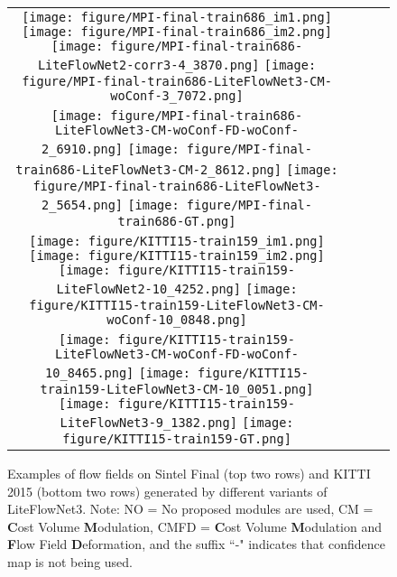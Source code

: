 \documentclass[runningheads]{llncs}
\begin{document}
\begin{figure*}[t]
\centering
\captionsetup[subfigure]{labelformat=empty, justification=centering}
\captionsetup[subfloat]{farskip=0pt,captionskip=0pt}
\begin{tabular}{cccc}
   \texttt{[image: figure/MPI-final-train686\_im1.png]}\hfill
   \texttt{[image: figure/MPI-final-train686\_im2.png]}\hfill
   \texttt{[image: figure/MPI-final-train686-LiteFlowNet2-corr3-4\_3870.png]}\hfill
   \texttt{[image: figure/MPI-final-train686-LiteFlowNet3-CM-woConf-3\_7072.png]}\vspace{-0.1cm}\\
	
   \texttt{[image: figure/MPI-final-train686-LiteFlowNet3-CM-woConf-FD-woConf-2\_6910.png]}\hfill
   \texttt{[image: figure/MPI-final-train686-LiteFlowNet3-CM-2\_8612.png]}\hfill
   \texttt{[image: figure/MPI-final-train686-LiteFlowNet3-2\_5654.png]}\hfill
   \texttt{[image: figure/MPI-final-train686-GT.png]}\\

   \texttt{[image: figure/KITTI15-train159\_im1.png]}\hfill
   \texttt{[image: figure/KITTI15-train159\_im2.png]}\hfill
   \texttt{[image: figure/KITTI15-train159-LiteFlowNet2-10\_4252.png]}\hfill
   \texttt{[image: figure/KITTI15-train159-LiteFlowNet3-CM-woConf-10\_0848.png]}\vspace{-0.1cm}\\

   \texttt{[image: figure/KITTI15-train159-LiteFlowNet3-CM-woConf-FD-woConf-10\_8465.png]}\hfill
   \texttt{[image: figure/KITTI15-train159-LiteFlowNet3-CM-10\_0051.png]}\hfill
   \texttt{[image: figure/KITTI15-train159-LiteFlowNet3-9\_1382.png]}\hfill
   \texttt{[image: figure/KITTI15-train159-GT.png]}
\end{tabular}
\caption{Examples of flow fields on Sintel Final (top two rows) and KITTI 2015 (bottom two rows) generated by different variants of LiteFlowNet3. Note: NO = No proposed modules are used, CM = \textbf{C}ost Volume \textbf{M}odulation, CMFD = \textbf{C}ost Volume \textbf{M}odulation and \textbf{F}low Field \textbf{D}eformation, and the suffix ``-" indicates that confidence map is not being used.}
\label{fig:ablation study}
\end{figure*}
\end{document}
